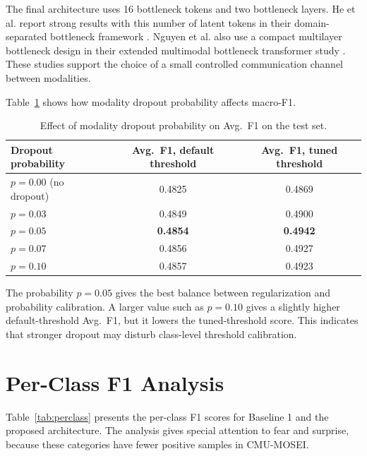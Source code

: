 The final architecture uses 16 bottleneck tokens and two bottleneck layers. He et al. report strong results with this number of latent tokens in their domain-separated bottleneck framework \cite{he2024domain}. Nguyen et al. also use a compact multilayer bottleneck design in their extended multimodal bottleneck transformer study \cite{nguyen2025enhanced}. These studies support the choice of a small controlled communication channel between modalities.

Table~\ref{tab:dropout_ablation} shows how modality dropout probability affects macro-F1.

\begin{table}[H]
\centering
\caption{Effect of modality dropout probability on Avg.~F1 on the test set.}
\label{tab:dropout_ablation}
\begin{tabular}{lcc}
\hline
\textbf{Dropout probability} & \textbf{Avg.~F1, default threshold} & \textbf{Avg.~F1, tuned threshold} \\
\hline
$p = 0.00$ (no dropout) & 0.4825 & 0.4869 \\
$p = 0.03$              & 0.4849 & 0.4900 \\
$p = 0.05$              & \textbf{0.4854} & \textbf{0.4942} \\
$p = 0.07$              & 0.4856 & 0.4927 \\
$p = 0.10$              & 0.4857 & 0.4923 \\
\hline
\end{tabular}
\end{table}

The probability $p=0.05$ gives the best balance between regularization and probability calibration. A larger value such as $p=0.10$ gives a slightly higher default-threshold Avg.~F1, but it lowers the tuned-threshold score. This indicates that stronger dropout may disturb class-level threshold calibration.

\section{Per-Class F1 Analysis}
\label{sec:perclass}

Table~\ref{tab:perclass} presents the per-class F1 scores for Baseline 1 and the proposed architecture. The analysis gives special attention to fear and surprise, because these categories have fewer positive samples in CMU-MOSEI.

